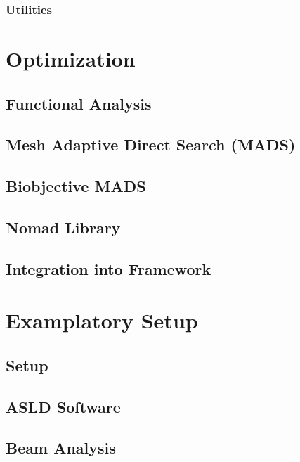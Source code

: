 \documentclass[a4paper,10pt]{article}
\begin{document}
    \subsubsection{Utilities} \label{sec:utilities}
    
    \section{Optimization}
    \subsection{Functional Analysis}
    \subsection{Mesh Adaptive Direct Search (MADS)}
    \subsection{Biobjective MADS}
    \subsection{Nomad Library}
    \subsection{Integration into Framework}

    \section{Examplatory Setup}
    \subsection{Setup}
    \subsection{ASLD Software}
    \subsection{Beam Analysis}

    \newpage

    
    
\end{document}
